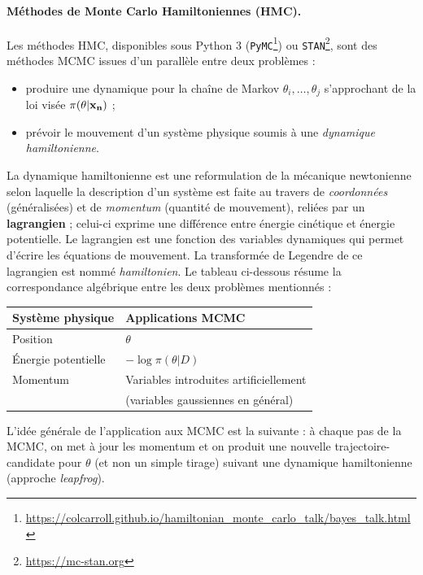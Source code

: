 \paragraph{Méthodes de Monte Carlo Hamiltoniennes (HMC).}
Les méthodes HMC, disponibles sous Python 3 (\texttt{PyMC}\footnote{\url{https://colcarroll.github.io/hamiltonian_monte_carlo_talk/bayes_talk.html}}) ou \texttt{STAN}\footnote{\url{https://mc-stan.org}}, sont des méthodes MCMC issues d'un parallèle entre deux problèmes :
\begin{itemize} 
\item produire une dynamique pour la chaîne de Markov $\theta_i,\ldots,\theta_j$ s'approchant de la loi visée $\pi(\theta|{\bf x_n})$ ;
\item prévoir le mouvement d'un système physique  soumis à une \emph{dynamique hamiltonienne}.
\end{itemize}
La dynamique hamiltonienne est une reformulation de la mécanique newtonienne selon laquelle la description d'un système est faite au travers de \emph{coordonnées} (généralisées) et de \emph{momentum} (quantité de mouvement), reliées par un {\bf lagrangien} ; celui-ci exprime une différence entre énergie cinétique et énergie potentielle. Le lagrangien est une fonction des variables dynamiques qui permet d'écrire les équations de mouvement. La transformée de Legendre de ce lagrangien est nommé \emph{hamiltonien}. Le tableau ci-dessous résume la correspondance algébrique entre les deux problèmes mentionnés :

\begin{center}
\begin{tabular}{l|l}
\hline
Système physique & Applications MCMC \\
\hline
Position & $\theta$ \\
\'Energie potentielle & $ -\log \pi(\theta|D)$ \\
Momentum & Variables introduites artificiellement \\
& (variables gaussiennes en général) \\
\hline
\end{tabular}
\end{center}

L'idée générale de l'application aux MCMC est la suivante : à chaque pas de la MCMC, on met à jour les momentum et on produit une nouvelle trajectoire-candidate pour $\theta$ (et non un simple tirage) suivant une dynamique hamiltonienne (approche {\it leapfrog}). \\

